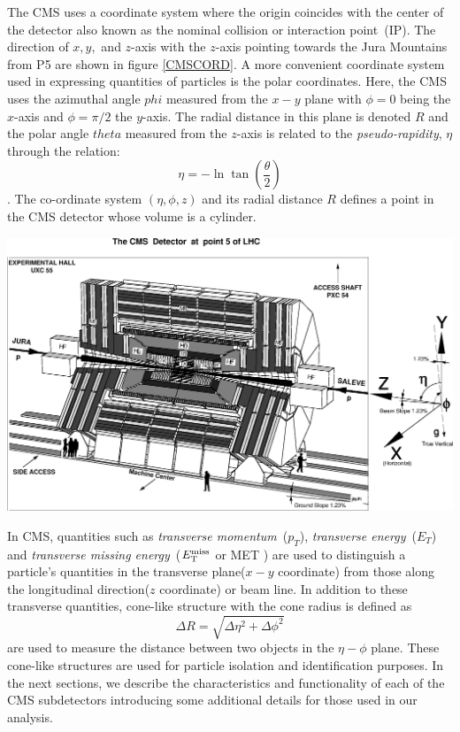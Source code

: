 The CMS uses a coordinate system where the origin coincides with the center of the detector also known as the nominal collision or interaction point~(IP). The direction of $x,y,$ and $z$-axis with the $z$-axis pointing towards the Jura Mountains from P5 are shown in figure \eqref{CMSCORD}. A more convenient coordinate system used in expressing quantities of particles is the polar coordinates. Here, the CMS  uses the azimuthal angle $phi$ measured from the $x-y$ plane with $\phi = 0 $ being the $x$-axis and $\phi = \pi/2 $ the $y$-axis. The radial distance in this plane is denoted $R$ and the polar angle $theta$  measured from the $z$-axis is related to the \textit{pseudo-rapidity}, $\eta$ through the relation: $$\displaystyle{\eta = -\ln \tan(\frac{\theta} {2}) } $$. The co-ordinate system $(\eta, \phi, z)$ and its radial distance $R$ defines a point in the CMS detector whose volume is a cylinder. 
\begin{center}\label{CMSCORD}
\centering
\mbox{\includegraphics[scale=0.6]{THESISPLOTS/CMS_DETECTOR.eps}} 
\label{fig:CMSDCORD.}
\end{center}

In CMS, quantities such as \textit{transverse momentum}~($p_{T}$), \textit{transverse energy}~($E_{T}$) and \textit{transverse missing energy}~($E_{\mathrm{T}}^{\text{miss}}$ or MET ) are used to distinguish a particle's quantities in the transverse plane($x-y$ coordinate) from those along the longitudinal direction($z$ coordinate) or beam line. In addition to these transverse quantities, cone-like structure with the cone radius is defined as $$\displaystyle{ \Delta R = \sqrt{ \Delta\eta^{2} + \Delta\phi^{2} } }$$ are used to measure the distance between two objects in the $\eta-\phi$ plane. These cone-like structures are used for particle isolation and identification purposes. In the next sections, we describe the characteristics and functionality of each of the CMS subdetectors introducing some additional details for those used in our analysis.


